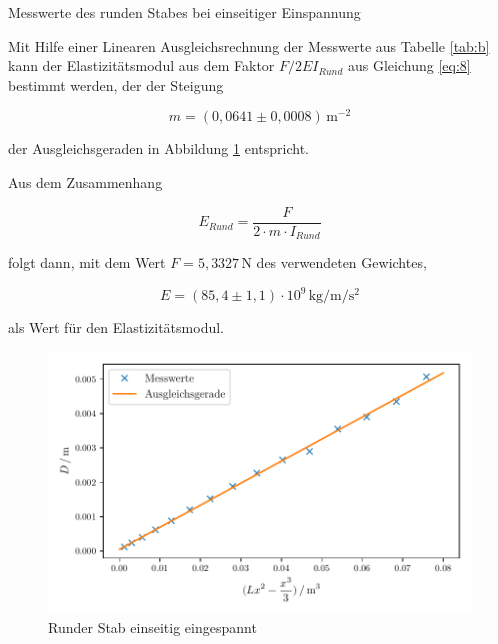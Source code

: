 \begin{table}[H]
  \centering
  
  
  \caption{Messwerte des runden Stabes bei einseitiger Einspannung}
  \label{tab:b}
\end{table}

Mit Hilfe einer Linearen Ausgleichsrechnung der Messwerte
aus Tabelle \ref{tab:b} kann der Elastizitätsmodul aus dem 
Faktor $F/2EI_{Rund}$ aus Gleichung \ref{eq:8} bestimmt werden, der der Steigung 

\begin{equation*}
  m=(0,0641 \pm 0,0008)\,\si{\meter\tothe{-2}}
\end{equation*}

\noindent der Ausgleichsgeraden
in Abbildung \ref{fig:a} entspricht.

Aus dem Zusammenhang 

\begin{equation}
  E_{Rund}=\frac{F}{2 \cdot m \cdot I_{Rund}}
\end{equation}

\noindent folgt dann, mit dem Wert $F=5,3327\,\si{\newton}$ des verwendeten Gewichtes,

\begin{equation*}
  E=(85,4 \pm 1,1) \cdot 10^{9} \,\si{\kilo\gram\per\meter\per\second\squared}
\end{equation*}

\noindent als Wert für den Elastizitätsmodul.


\begin{figure}[H]
  \centering
  \includegraphics{build/plot1.pdf}
  \caption{Runder Stab einseitig eingespannt}
  \label{fig:a}
\end{figure}




